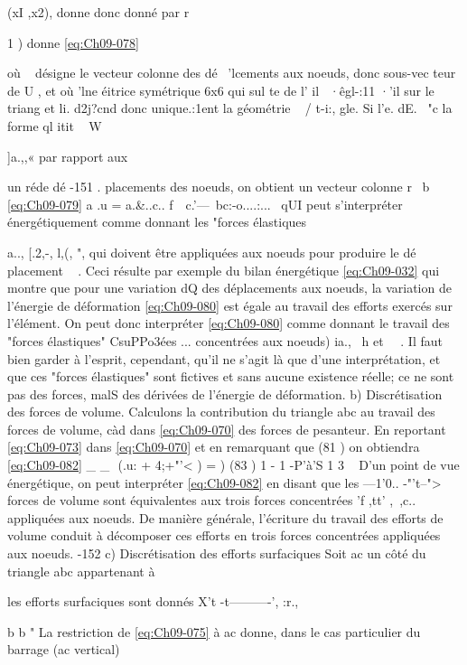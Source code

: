 {{{{{(xI ,x2), 
donne donc 
donné par 
r 

1 
) 
donne 
\eqref{eq:Ch09-078} 

où  ~  désigne le vecteur  colonne  des  dé~  'lcements  aux  noeuds,  donc  
sous-vec teur  de  U  ,  et où  'lne  éitrice  symétrique  6x6  qui  
sul te  de  l' il ~·êgl-:11­ ·'il  sur  le  triang  et  li.  d2j?cnd  donc  unique.:1ent  
la  géométrie  ~ /  t­-i:,  gle.  
Si  l'e.  dE.  ~"c  la  forme  ql  itit  ~  W {]a.,,«­ par  rapport  aux  

un ré­de 
dé
-151 
.
placements des noeuds, on obtient un vecteur colonne r 
~b 
\eqref{eq:Ch09-079} a .u 
= a.&..c.. 
f~~c.'---~bc:-o....:...~ 
qUI peut s'interpréter énergétiquement comme donnant les "forces élastiques 
{a.., [.2,-, l,(, ", qui 
doivent être appliquées aux noeuds pour produire le dé
placement ~ . Ceci résulte par exemple du bilan énergétique \eqref{eq:Ch09-032} qui montre 
que pour une variation dQ des déplacements aux noeuds, la variation de 
l'énergie de déformation 
\eqref{eq:Ch09-080} 
est égale au travail des efforts exercés sur l'élément. On peut donc inter­préter \eqref{eq:Ch09-080} comme donnant le travail des "forces élastiques" CsuPPo3ées 
... 
concentrées aux noeuds) ia., ~h et ~~. Il faut bien garder à l'esprit, 
cependant, qu'il ne s'agit là que d'une interprétation, et que ces "forces 
élastiques" sont fictives et sans aucune existence réelle; ce ne sont pas 
des forces, malS des dérivées de l'énergie de déformation. 
b) Discrétisation des forces de volume. Calculons la contribution du triangle abc au travail des forces de volume, càd dans \eqref{eq:Ch09-070} des forces de pesanteur. En reportant \eqref{eq:Ch09-073} dans 
\eqref{eq:Ch09-070} et en remarquant que 
(81 ) 
on obtiendra 
\eqref{eq:Ch09-082} _ _  (.u: + 4;+"'< ) = 
) 
(83 ) 1 - 1 -P'à'S 1 3 ~ 
D'un point de vue énergétique, on peut interpréter \eqref{eq:Ch09-082} en disant que les 
---1'0.. -"'t--">
forces de volume sont équivalentes aux trois forces concentrées 'f ,tt' ,~,c.. appliquées aux noeuds. 
De manière générale, l'écriture du travail des efforts de volume conduit à décomposer ces efforts en trois forces concentrées appliquées aux noeuds. 
-152 ­c) Discrétisation des efforts surfaciques 
Soit ac un côté du triangle abc appartenant à 

les efforts surfaciques sont donnés 
X't -t----------', :r., 

b
b
" 
La restriction de \eqref{eq:Ch09-075} à ac donne, dans le cas particulier du barrage (ac vertical) 

}}}}}}}
